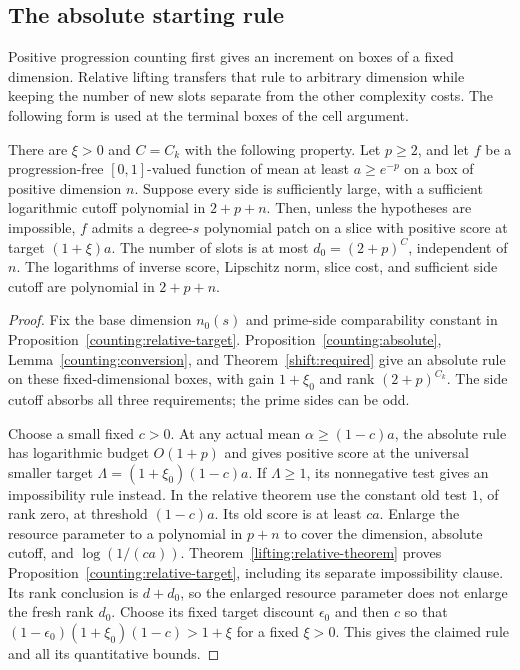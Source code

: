 \subsection{The absolute starting rule}

Positive progression counting first gives an increment on boxes of a
fixed dimension. Relative lifting transfers that rule to arbitrary
dimension while keeping the number of new slots separate from the
other complexity costs. The following form is used at the terminal
boxes of the cell argument.

\begin{lemma}\label{ap:absolute}
There are $\xi>0$ and $C=C_k$ with the following property.
Let $p\ge2$, and let $f$ be a progression-free $[0,1]$-valued
function of mean at least $a\ge e^{-p}$ on a box of positive
dimension $n$. Suppose every side is sufficiently large, with
a sufficient logarithmic cutoff polynomial in $2+p+n$. Then,
unless the hypotheses are impossible, $f$ admits a degree-$s$
polynomial patch on a slice with positive score at target $(1+\xi)a$. The number of slots is at most
$d_0=(2+p)^C$, independent of $n$. The logarithms of inverse score,
Lipschitz norm, slice cost, and sufficient side cutoff are
polynomial in $2+p+n$.
\end{lemma}

\begin{proof}
Fix the base dimension $n_0(s)$ and prime-side comparability
constant in Proposition~\ref{counting:relative-target}.
Proposition~\ref{counting:absolute}, Lemma~\ref{counting:conversion},
and Theorem~\ref{shift:required} give an absolute rule on these
fixed-dimensional boxes, with gain $1+\xi_0$ and rank
$(2+p)^{C_k}$. The side cutoff absorbs all three requirements;
the prime sides can be odd.

Choose a small fixed $c>0$. At any actual mean
$\alpha\ge(1-c)a$, the absolute rule has logarithmic budget
$O(1+p)$ and gives positive score at the universal smaller target
$\Lambda=(1+\xi_0)(1-c)a$. If $\Lambda\ge1$, its nonnegative
test gives an impossibility rule instead. In the relative theorem
use the constant old test $1$, of rank zero, at threshold
$(1-c)a$. Its old score is at least $ca$.
Enlarge the resource parameter to a polynomial in $p+n$ to cover
the dimension, absolute cutoff, and $\log(1/(ca))$.
Theorem~\ref{lifting:relative-theorem} proves
Proposition~\ref{counting:relative-target}, including its separate
impossibility clause. Its rank conclusion is $d+d_0$, so the
enlarged resource parameter does not enlarge the fresh rank $d_0$.
Choose its fixed target discount $\epsilon_0$ and then $c$ so that
$(1-\epsilon_0)(1+\xi_0)(1-c)>1+\xi$ for a fixed $\xi>0$.
This gives the claimed rule and all its quantitative bounds.
\end{proof}


